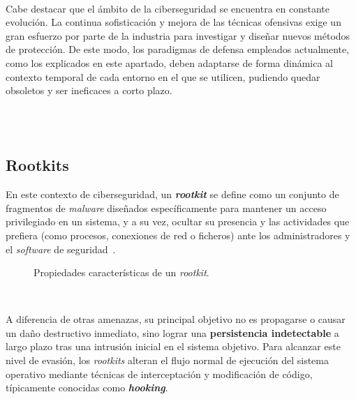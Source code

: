 \

Cabe destacar que el ámbito de la ciberseguridad se encuentra en constante evolución. La continua sofisticación y mejora de las técnicas ofensivas exige un gran esfuerzo por parte de la industria para investigar y diseñar nuevos métodos de protección.
De este modo, los paradigmas de defensa empleados actualmente, como los explicados en este apartado, deben adaptarse de forma dinámica al contexto temporal de cada entorno en el que se utilicen, pudiendo quedar obsoletos y ser ineficaces a corto plazo.\\

\

\

\subsection{Rootkits}
\label{sec:rootkits}

En este contexto de ciberseguridad, un \textbf{\textit{rootkit}} se define como un conjunto de fragmentos de \textit{malware} diseñados específicamente para mantener un acceso privilegiado en un sistema, y a su vez, ocultar su presencia y las actividades que prefiera (como procesos, conexiones de red o ficheros) ante los administradores y el \textit{software} de seguridad~\cite{rootkits}.\\

\begin{figure}[h!]
  \centering
  \makebox[\textwidth][c]{\scalebox{1.2}{}}
  \caption{Propiedades características de un \textit{rootkit}.}
  \label{fig:rootkits_layers}
\end{figure}

\

A diferencia de otras amenazas, su principal objetivo no es propagarse o causar un daño destructivo inmediato, sino lograr una \textbf{persistencia indetectable} a largo plazo tras una intrusión inicial en el sistema objetivo.
Para alcanzar este nivel de evasión, los \textit{rootkits} alteran el flujo normal de ejecución del sistema operativo mediante técnicas de interceptación y modificación de código, típicamente conocidas como \textbf{\textit{hooking}}.\\

